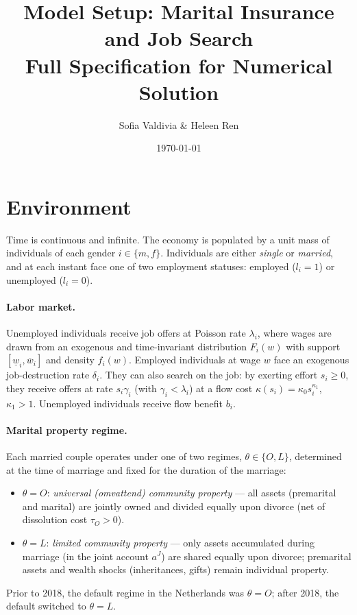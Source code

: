 \documentclass[11pt]{article}
\title{Model Setup: Marital Insurance and Job Search\\
\large Full Specification for Numerical Solution}
\author{Sofia Valdivia \& Heleen Ren}
\date{\today}
\newcommand{\aJ}{a^{J}}
\begin{document}
\maketitle

\section{Environment}

Time is continuous and infinite. The economy is populated by a unit mass of individuals of each gender $i \in \{m,f\}$. Individuals are either \textit{single} or \textit{married}, and at each instant face one of two employment statuses: employed ($l_i = 1$) or unemployed ($l_i = 0$).

\paragraph{Labor market.} Unemployed individuals receive job offers at Poisson rate $\lambda_i$, where wages are drawn from an exogenous and time-invariant distribution $F_i(w)$ with support $[\underline{w}_i, \overline{w}_i]$ and density $f_i(w)$. Employed individuals at wage $w$ face an exogenous job-destruction rate $\delta_i$. They can also search on the job: by exerting effort $s_i \geq 0$, they receive offers at rate $s_i \gamma_i$ (with $\gamma_i < \lambda_i$) at a flow cost $\kappa(s_i) = \kappa_0 s_i^{\kappa_1}$, $\kappa_1 > 1$. Unemployed individuals receive flow benefit $b_i$.

\paragraph{Marital property regime.} Each married couple operates under one of two regimes, $\theta \in \{O, L\}$, determined at the time of marriage and fixed for the duration of the marriage:
\begin{itemize}
    \item $\theta = O$: \textit{universal (omvattend) community property} --- all assets (premarital and marital) are jointly owned and divided equally upon divorce (net of dissolution cost $\tau_O > 0$).
    \item $\theta = L$: \textit{limited community property} --- only assets accumulated during marriage (in the joint account $\aJ$) are shared equally upon divorce; premarital assets and wealth shocks (inheritances, gifts) remain individual property.
\end{itemize}
Prior to 2018, the default regime in the Netherlands was $\theta = O$; after 2018, the default switched to $\theta = L$.
\end{document}
